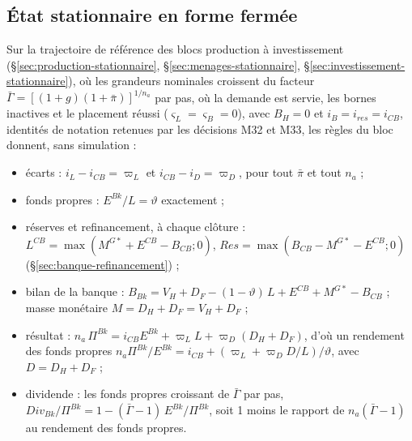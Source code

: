 \documentclass[11pt,a4paper]{article}
\begin{document}
\subsection{État stationnaire en forme fermée}
\label{sec:banque-stationnaire}
\begin{proposee}
Sur la trajectoire de référence des blocs production à investissement (\S\ref{sec:production-stationnaire}, \S\ref{sec:menages-stationnaire}, \S\ref{sec:investissement-stationnaire}), où les grandeurs nominales croissent du facteur $\bar\Gamma = [(1 + g)(1 + \bar\pi)]^{1/n_a}$ par pas, où la demande est servie, les bornes inactives et le placement réussi ($\varsigma_L = \varsigma_B = 0$), avec $B_H = 0$ et $i_B = i_{\mathit{res}} = i_{\mathit{CB}}$, identités de notation retenues par les décisions M32 et M33, les règles du bloc donnent, sans simulation :
\begin{itemize}
\item écarts : $i_L - i_{\mathit{CB}} = \varpi_L$ et $i_{\mathit{CB}} - i_D = \varpi_D$, pour tout $\bar\pi$ et tout $n_a$ ;
\item fonds propres : $E^{\mathit{Bk}}/L = \vartheta$ exactement ;
\item réserves et refinancement, à chaque clôture : $L^{\mathit{CB}} = \max(M^{G*} + E^{\mathit{CB}} - B_{\mathit{CB}} ; 0)$, $\mathit{Res} = \max(B_{\mathit{CB}} - M^{G*} - E^{\mathit{CB}} ; 0)$ (\S\ref{sec:banque-refinancement}) ;
\item bilan de la banque : $B_{\mathit{Bk}} = V_H + D_F - (1 - \vartheta)\,L + E^{\mathit{CB}} + M^{G*} - B_{\mathit{CB}}$ ; masse monétaire $M = D_H + D_F = V_H + D_F$ ;
\item résultat : $n_a\,\Pi^{\mathit{Bk}} = i_{\mathit{CB}} E^{\mathit{Bk}} + \varpi_L L + \varpi_D (D_H + D_F)$, d'où un rendement des fonds propres $n_a\Pi^{\mathit{Bk}}/E^{\mathit{Bk}} = i_{\mathit{CB}} + (\varpi_L + \varpi_D D/L)/\vartheta$, avec $D = D_H + D_F$ ;
\item dividende : les fonds propres croissant de $\bar\Gamma$ par pas, $\mathit{Div}_{\mathit{Bk}}/\Pi^{\mathit{Bk}} = 1 - (\bar\Gamma - 1)\,E^{\mathit{Bk}}/\Pi^{\mathit{Bk}}$, soit 1 moins le rapport de $n_a(\bar\Gamma - 1)$ au rendement des fonds propres.
\end{itemize}

\end{proposee}
\end{document}
